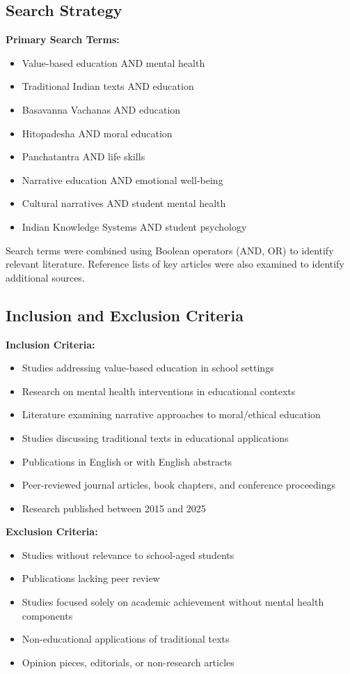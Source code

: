\documentclass[12pt,a4paper,twocolumn]{article}
\begin{document}
\subsection{Search Strategy}

\textbf{Primary Search Terms:}
\begin{itemize}
    \item Value-based education AND mental health
    \item Traditional Indian texts AND education
    \item Basavanna Vachanas AND education
    \item Hitopadesha AND moral education
    \item Panchatantra AND life skills
    \item Narrative education AND emotional well-being
    \item Cultural narratives AND student mental health
    \item Indian Knowledge Systems AND student psychology
\end{itemize}

Search terms were combined using Boolean operators (AND, OR) to identify relevant literature. Reference lists of key articles were also examined to identify additional sources.

\subsection{Inclusion and Exclusion Criteria}

\textbf{Inclusion Criteria:}
\begin{itemize}
    \item Studies addressing value-based education in school settings
    \item Research on mental health interventions in educational contexts
    \item Literature examining narrative approaches to moral/ethical education
    \item Studies discussing traditional texts in educational applications
    \item Publications in English or with English abstracts
    \item Peer-reviewed journal articles, book chapters, and conference proceedings
    \item Research published between 2015 and 2025
\end{itemize}

\textbf{Exclusion Criteria:}
\begin{itemize}
    \item Studies without relevance to school-aged students
    \item Publications lacking peer review
    \item Studies focused solely on academic achievement without mental health components
    \item Non-educational applications of traditional texts
    \item Opinion pieces, editorials, or non-research articles
\end{itemize}
\end{document}
